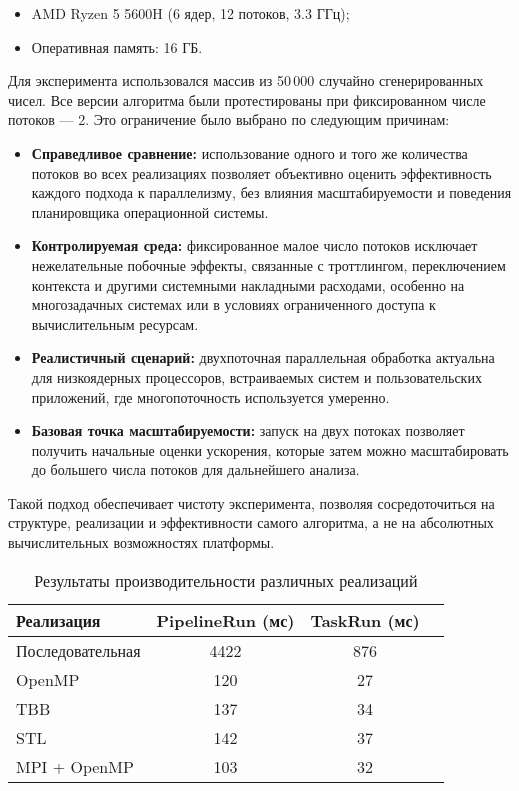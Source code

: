 \documentclass[a4paper,12pt]{article}
\begin{document}
\begin{itemize}
    \item AMD Ryzen 5 5600H (6 ядер, 12 потоков, 3.3 ГГц);
    \item Оперативная память: 16 ГБ.
\end{itemize}

Для эксперимента использовался массив из 50\,000 случайно сгенерированных чисел. Все версии алгоритма были протестированы при фиксированном числе потоков — 2. Это ограничение было выбрано по следующим причинам:
\begin{itemize}
    \item \textbf{Справедливое сравнение:} использование одного и того же количества потоков во всех реализациях позволяет объективно оценить эффективность каждого подхода к параллелизму, без влияния масштабируемости и поведения планировщика операционной системы.

    \item \textbf{Контролируемая среда:} фиксированное малое число потоков исключает нежелательные побочные эффекты, связанные с троттлингом, переключением контекста и другими системными накладными расходами, особенно на многозадачных системах или в условиях ограниченного доступа к вычислительным ресурсам.

    \item \textbf{Реалистичный сценарий:} двухпоточная параллельная обработка актуальна для низкоядерных процессоров, встраиваемых систем и пользовательских приложений, где многопоточность используется умеренно.

    \item \textbf{Базовая точка масштабируемости:} запуск на двух потоках позволяет получить начальные оценки ускорения, которые затем можно масштабировать до большего числа потоков для дальнейшего анализа.
\end{itemize}

Такой подход обеспечивает чистоту эксперимента, позволяя сосредоточиться на структуре, реализации и эффективности самого алгоритма, а не на абсолютных вычислительных возможностях платформы.
\bigskip
\begin{table}[h!]
\centering
\caption{Результаты производительности различных реализаций}
\begin{tabular}{|l|c|c|c|}
\hline
\textbf{Реализация} & \textbf{PipelineRun (мс)} & \textbf{TaskRun (мс)} \\
\hline
Последовательная & 4422 & 876  \\
OpenMP           & 120  & 27 \\
TBB              & 137  & 34 \\
STL              & 142  & 37 \\
MPI + OpenMP     & 103  & 32 \\
\hline
\end{tabular}
\label{tab:results}
\end{table}
\newpage
\end{document}
